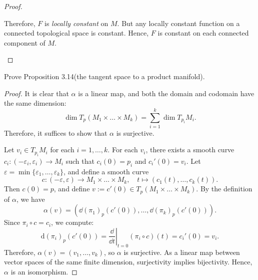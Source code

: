 \begin{problem}
\begin{proof}
\begin{itemize}
            Therefore, \( F \) is \emph{locally constant} on \( M \). But any locally constant function on a connected topological space is constant. Hence, \( F \) is constant on each connected component of \( M \).

        \end{itemize}
    \end{proof}
\end{problem}

\begin{problem}
    Prove Proposition 3.14(the tangent space to a product manifold).
    \begin{proof}
        It is clear that \( \alpha \) is a linear map, and both the domain and codomain have the same dimension:
        \[
        \dim T_p(M_1 \times \dots \times M_k) = \sum_{i=1}^k \dim T_{p_i}M_i.
        \]
        Therefore, it suffices to show that \( \alpha \) is surjective.

        Let \( v_i \in T_{p_i}M_i \) for each \( i = 1, \dots, k \). For each \( v_i \), there exists a smooth curve \( c_i \colon (-\varepsilon_i, \varepsilon_i) \to M_i \) such that \( c_i(0) = p_i \) and \( c_i'(0) = v_i \). Let \( \varepsilon = \min\{\varepsilon_1, \dots, \varepsilon_k\} \), and define a smooth curve
        \[
        c \colon (-\varepsilon, \varepsilon) \to M_1 \times \dots \times M_k, \quad t \mapsto (c_1(t), \dots, c_k(t)).
        \]
        Then \( c(0) = p \), and define \( v := c'(0) \in T_p(M_1 \times \dots \times M_k) \). By the definition of \( \alpha \), we have
        \[
        \alpha(v) = \left(\dd{(\pi_1)}_p(c'(0)), \dots, \dd{(\pi_k)}_p(c'(0)) \right).
        \]
        Since \( \pi_i \circ c = c_i \), we compute:
        \[
        \mathrm{d}(\pi_i)_p(c'(0)) = \left. \frac{\dd}{\dd{t}}\right|_{t=0} (\pi_i \circ c)(t) = c_i'(0) = v_i.
        \]
        Therefore, \( \alpha(v) = (v_1, \dots, v_k) \), so \( \alpha \) is surjective. As a linear map between vector spaces of the same finite dimension, surjectivity implies bijectivity. Hence, \( \alpha \) is an isomorphism.
    \end{proof}
\end{problem}

